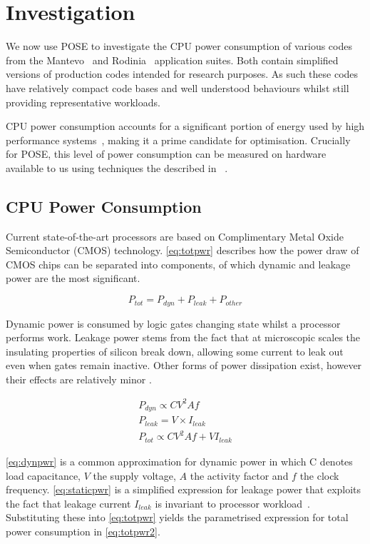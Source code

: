 \section{Investigation}
\label{sec:investigation}
We now use POSE to investigate the CPU power consumption of various codes from the Mantevo~\cite{heroux:2009aa} and Rodinia~\cite{che:2009aa} application suites.
Both contain simplified versions of production codes intended for research purposes.
As such these codes have relatively compact code bases and well understood behaviours whilst still providing representative workloads.

CPU power consumption accounts for a significant portion of energy used by high performance systems~\cite{rong:2010aa}, making it a prime candidate for optimisation.
Crucially for POSE, this level of power consumption can be measured on hardware available to us using techniques the described in ~\cite{hackenberg:2013aa}.

\subsection{CPU Power Consumption}
Current state-of-the-art processors are based on Complimentary Metal Oxide Semiconductor (CMOS) technology.
\autoref{eq:totpwr} describes how the power draw of CMOS chips can be separated into components, of which dynamic and leakage power are the most significant.


\begin{equation}
\label{eq:totpwr}
P_{tot} = P_{dyn} + P_{leak} + P_{other}
\end{equation}


Dynamic power is consumed by logic gates changing state whilst a processor performs work. 
Leakage power stems from the fact that at microscopic scales the insulating properties of silicon break down, allowing some current to leak out even when gates remain inactive.
Other forms of power dissipation exist, however their effects are relatively minor \cite{kaxiras:2008aa}.

\begin{gather}
P_{dyn} \propto CV^{2}Af \label{eq:dynpwr} \\
P_{leak} = V \times I_{leak} \label{eq:staticpwr} \\
P_{tot} \propto CV^{2}Af + VI_{leak} \label{eq:totpwr2}
\end{gather}


\autoref{eq:dynpwr} is a common approximation for dynamic power in which C denotes load capacitance, $V$ the supply voltage, $A$ the activity factor and $f$ the clock frequency. \autoref{eq:staticpwr} is a simplified expression for leakage power that exploits the fact that leakage current $I_{leak}$ is invariant to processor workload~\cite{kim:2003aa}. Substituting these into \autoref{eq:totpwr} yields the parametrised expression for total power consumption in \autoref{eq:totpwr2}.

